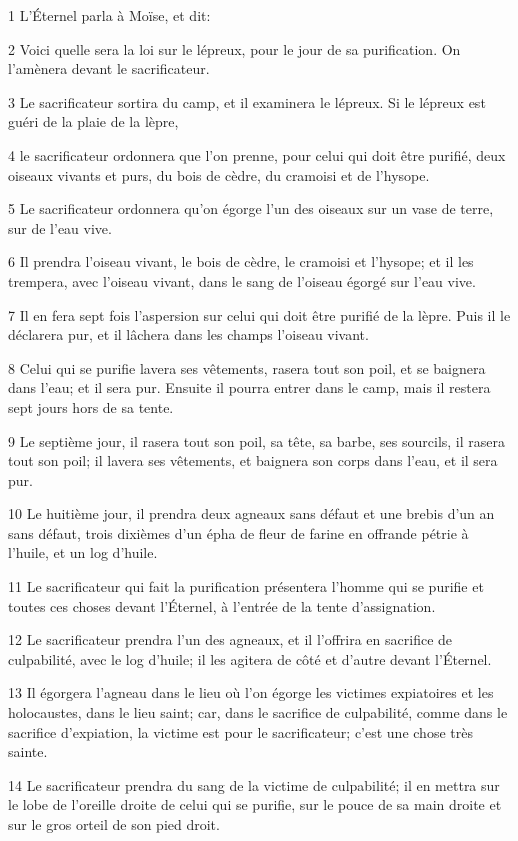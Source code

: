 \par 1 L'Éternel parla à Moïse, et dit:
\par 2 Voici quelle sera la loi sur le lépreux, pour le jour de sa purification. On l'amènera devant le sacrificateur.
\par 3 Le sacrificateur sortira du camp, et il examinera le lépreux. Si le lépreux est guéri de la plaie de la lèpre,
\par 4 le sacrificateur ordonnera que l'on prenne, pour celui qui doit être purifié, deux oiseaux vivants et purs, du bois de cèdre, du cramoisi et de l'hysope.
\par 5 Le sacrificateur ordonnera qu'on égorge l'un des oiseaux sur un vase de terre, sur de l'eau vive.
\par 6 Il prendra l'oiseau vivant, le bois de cèdre, le cramoisi et l'hysope; et il les trempera, avec l'oiseau vivant, dans le sang de l'oiseau égorgé sur l'eau vive.
\par 7 Il en fera sept fois l'aspersion sur celui qui doit être purifié de la lèpre. Puis il le déclarera pur, et il lâchera dans les champs l'oiseau vivant.
\par 8 Celui qui se purifie lavera ses vêtements, rasera tout son poil, et se baignera dans l'eau; et il sera pur. Ensuite il pourra entrer dans le camp, mais il restera sept jours hors de sa tente.
\par 9 Le septième jour, il rasera tout son poil, sa tête, sa barbe, ses sourcils, il rasera tout son poil; il lavera ses vêtements, et baignera son corps dans l'eau, et il sera pur.
\par 10 Le huitième jour, il prendra deux agneaux sans défaut et une brebis d'un an sans défaut, trois dixièmes d'un épha de fleur de farine en offrande pétrie à l'huile, et un log d'huile.
\par 11 Le sacrificateur qui fait la purification présentera l'homme qui se purifie et toutes ces choses devant l'Éternel, à l'entrée de la tente d'assignation.
\par 12 Le sacrificateur prendra l'un des agneaux, et il l'offrira en sacrifice de culpabilité, avec le log d'huile; il les agitera de côté et d'autre devant l'Éternel.
\par 13 Il égorgera l'agneau dans le lieu où l'on égorge les victimes expiatoires et les holocaustes, dans le lieu saint; car, dans le sacrifice de culpabilité, comme dans le sacrifice d'expiation, la victime est pour le sacrificateur; c'est une chose très sainte.
\par 14 Le sacrificateur prendra du sang de la victime de culpabilité; il en mettra sur le lobe de l'oreille droite de celui qui se purifie, sur le pouce de sa main droite et sur le gros orteil de son pied droit.
